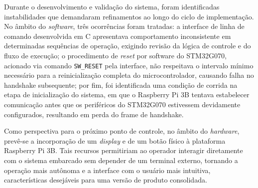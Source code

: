 Durante o desenvolvimento e validação do sistema, foram identificadas instabilidades
que demandaram refinamentos ao longo do ciclo de implementação. No âmbito do
\textit{software}, três ocorrências foram tratadas: a interface de linha de comando
desenvolvida em C apresentava comportamento inconsistente em determinadas sequências
de operação, exigindo revisão da lógica de controle e do fluxo de execução; o
procedimento de \textit{reset} por software do STM32G070, acionado via comando
\texttt{SW\_RESET} pela interface, não respeitava o intervalo mínimo necessário para
a reinicialização completa do microcontrolador, causando falha no handshake subsequente;
por fim, foi identificada uma condição de corrida na etapa de inicialização do sistema,
em que o Raspberry Pi 3B tentava estabelecer comunicação antes que os periféricos do
STM32G070 estivessem devidamente configurados, resultando em perda do frame de
handshake.

Como perspectiva para o próximo ponto de controle, no âmbito do \textit{hardware}, prevê-se a
incorporação de um \textit{display} e de um botão físico à plataforma Raspberry Pi 3B.
Tais recursos permitiriam ao operador interagir diretamente com o sistema embarcado
sem depender de um terminal externo, tornando a operação mais autônoma e a interface
com o usuário mais intuitiva, características desejáveis para uma versão de produto
consolidada.


